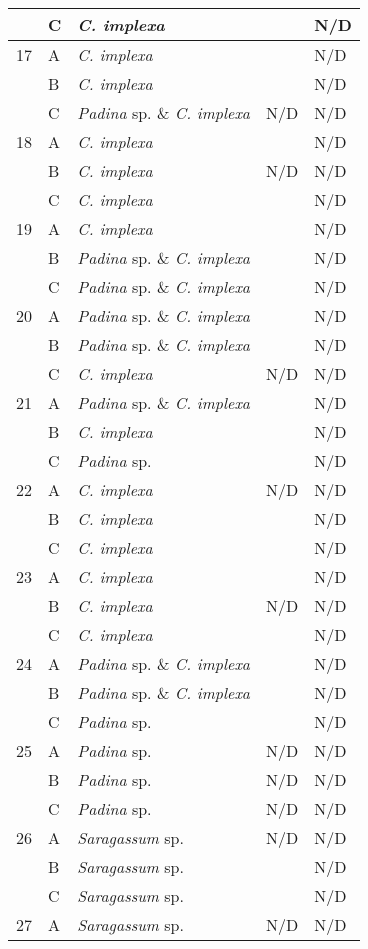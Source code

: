 \documentclass[12pt]{article}
\begin{document}
\begin{longtable}{ | p{1cm} | p{1cm} | p{3cm} | p{4cm} | p{4cm} | }
\hline
&C&\emph{C. implexa}&&N/D\\
\hline
17&A&\emph{C. implexa}&&N/D\\
\hline
&B&\emph{C. implexa}&&N/D\\
\hline
&C&\emph{Padina} sp. \& \emph{C. implexa}&N/D&N/D\\
\hline
18&A&\emph{C. implexa}&&N/D\\
\hline
&B&\emph{C. implexa}&N/D&N/D\\
\hline
&C&\emph{C. implexa}&&N/D\\
\hline
19&A&\emph{C. implexa}&&N/D\\
\hline
&B&\emph{Padina} sp. \& \emph{C. implexa}&&N/D\\
\hline
&C&\emph{Padina} sp. \& \emph{C. implexa}&&N/D\\
\hline
20&A&\emph{Padina} sp. \& \emph{C. implexa}&&N/D\\
\hline
&B&\emph{Padina} sp. \& \emph{C. implexa}&&N/D\\
\hline
&C&\emph{C. implexa}&N/D&N/D\\
\hline
21&A&\emph{Padina} sp. \& \emph{C. implexa}&&N/D\\
\hline
&B&\emph{C. implexa}&&N/D\\
\hline
&C&\emph{Padina} sp.&&N/D\\
\hline
22&A&\emph{C. implexa}&N/D&N/D\\
\hline
&B&\emph{C. implexa}&&N/D\\
\hline
&C&\emph{C. implexa}&&N/D\\
\hline
23&A&\emph{C. implexa}&&N/D\\
\hline
&B&\emph{C. implexa}&N/D&N/D\\
\hline
&C&\emph{C. implexa}&&N/D\\
\hline
24&A&\emph{Padina} sp. \& \emph{C. implexa}&&N/D\\
\hline
&B&\emph{Padina} sp. \& \emph{C. implexa}&&N/D\\
\hline
&C&\emph{Padina} sp.&&N/D\\
\hline
25&A&\emph{Padina} sp.&N/D&N/D\\
\hline
&B&\emph{Padina} sp.&N/D&N/D\\
\hline
&C&\emph{Padina} sp.&N/D&N/D\\
\hline
26&A&\emph{Saragassum} sp.&N/D&N/D\\
\hline
&B&\emph{Saragassum} sp.&&N/D\\
\hline
&C&\emph{Saragassum} sp.&&N/D\\
\hline
27&A&\emph{Saragassum} sp.&N/D&N/D\\

\end{longtable}
\end{document}
